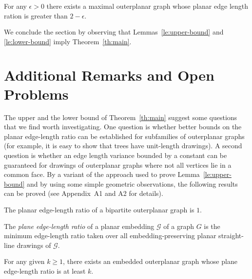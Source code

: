 \documentclass[orivec]{llncs}
\begin{document}
\begin{lemma}\label{le:lower-bound}
  For any $\epsilon > 0$ there exists a maximal outerplanar graph whose planar edge length ration is greater than $ 2 - \epsilon$.
\end{lemma}

We conclude the section by observing that Lemmas~\ref{le:upper-bound} and \ref{le:lower-bound} imply Theorem~\ref{th:main}.


\section{Additional Remarks and Open Problems}\label{se:openproblems}

The upper and the lower bound of Theorem~\ref{th:main} suggest some questions that we find worth investigating. One question is whether better bounds on the planar edge-length ratio can be established for subfamilies of outerplanar graphs (for example, it is easy to show that trees have
unit-length drawings). A second question is whether an edge length variance bounded by a constant can be guaranteed for drawings of outerplanar graphs where not all vertices lie in a common face. By a variant of the approach used to prove Lemma~\ref{le:upper-bound} and by using some simple geometric observations, the following results can be proved (see Appendix~A1 and A2 for details).

\begin{theorem}\label{th:bipartite}
  The planar edge-length ratio of a bipartite outerplanar graph is $1$.
\end{theorem}

The \emph{plane edge-length ratio} of a planar embedding $\mathcal{G}$ of a graph $G$ is the minimum edge-length ratio taken over all embedding-preserving planar straight-line drawings of $\mathcal{G}$.

\begin{theorem}\label{th:fixed-embedding}
For any given $k \geq 1$, there exists an embedded outerplanar graph whose plane edge-length ratio is at least $k$.
\end{theorem}
\end{document}
